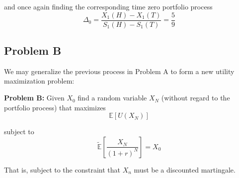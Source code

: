 \documentclass[12pt]{article}
\newlength\tindent
\renewcommand{\indent}{\hspace*{\tindent}}
\newcommand{\E}{\mathbb E}
\begin{document}
and once again finding the corresponding time zero portfolio process
\begin{equation*}
	\Delta_0 = \frac{X_1(H) - X_1(T)}{S_1(H) - S_1(T)} = \frac{5}{9}
\end{equation*}

\subsection{Problem B}

\indent We may generalize the previous process in Problem A to form a new utility maximization problem:

\begin{framed}
{\bf Problem B:} Given $X_0$ find a random variable $X_N$ (without regard to the portfolio process) that maximizes
\begin{equation*}
	\E[U(X_N)]
\end{equation*}

subject to
\begin{equation*}
	\tilde{\E} \left[ \frac{X_N}{(1 + r)^N} \right] = X_0
\end{equation*}

That is, subject to the constraint that $X_n$ must be a discounted martingale.
\end{framed}
\end{document}
